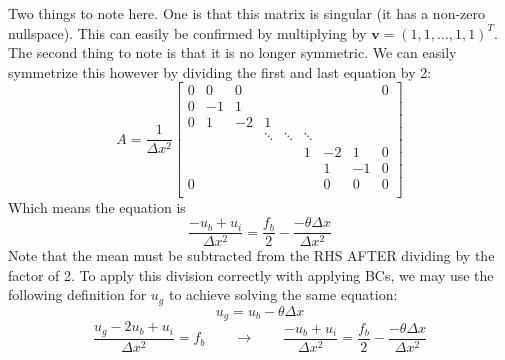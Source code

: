 \documentclass[landscape]{article}
\begin{document}
Two things to note here. One is that this matrix is singular (it has a non-zero nullspace). This can easily be confirmed by multiplying by $\mathbf{v} = (1,1,\dots,1,1)^T$. The second thing to note is that it is no longer symmetric. We can easily symmetrize this however by dividing the first and last equation by 2:
\[A = \frac{1}{\Delta x^2} \left[\begin{array}{ccccccccc}
0  & 0     & 0         &           &           &           &           &         &  0 \\
0  & -1    & 1         &           &           &           &           &         &    \\
0  & 1     & -2        & 1         &           &           &           &         &    \\
   &       &           & \ddots    & \ddots    & \ddots    &           &         &    \\
   &       &           &           &           & 1         & -2        & 1       &  0 \\
   &       &           &           &           &           &  1        & -1      &  0 \\
0  &       &           &           &           &           &  0        & 0       &  0 \\
\end{array} \right]
\]
Which means the equation is
\begin{equation}
   \frac{- u_b + u_i}{\Delta x^2} = \frac{f_b}{2}  - \frac{-\theta \Delta x}{\Delta x^2}
\end{equation}
Note that the mean must be subtracted from the RHS AFTER dividing by the factor of 2. To apply this division correctly with applying BCs, we may use the following definition for $u_g$ to achieve solving the same equation:
\begin{equation}
  \boxed{
  u_g = u_b - \theta \Delta x
  }
\end{equation}
\begin{equation}
   \frac{u_g - 2 u_b + u_i}{\Delta x^2} = f_b
   \qquad \rightarrow \qquad
   \frac{- u_b + u_i}{\Delta x^2} = \frac{f_b}{2} - \frac{- \theta \Delta x}{\Delta x^2}
\end{equation}
\end{document}
